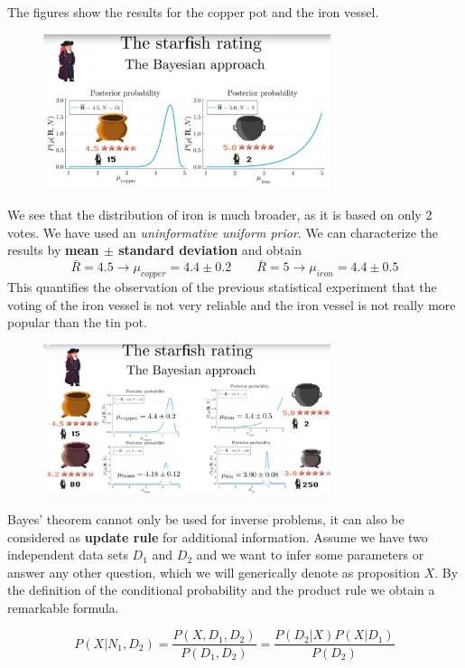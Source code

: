 \documentclass[12pt, a4paper]{scrartcl}
\begin{document}
The figures show the results for the copper pot and the iron vessel. %
 \begin{figure}[H]
	\centering
	\includegraphics[width=0.75\textwidth]{6_11.png}
\end{figure}
We see
that the distribution of iron is much broader, as it is based on only 2 votes. We
have used an \textit{uninformative uniform prior}.
We can characterize the results by \textbf{mean $\pm$ standard deviation} and
obtain \[\bar{R}=4.5\rightarrow \mu_{copper}=4.4\pm0.2\qquad \bar{R}=5\rightarrow \mu_{iron}=4.4\pm0.5\]
This quantifies the observation of the previous statistical experiment that
the voting of the iron vessel is not very reliable and the iron vessel is not
really more popular than the tin pot.\\%
 \begin{figure}[H]
	\centering
	\includegraphics[width=0.75\textwidth]{6_12.png}
\end{figure}


Bayes’ theorem cannot only be used for inverse problems, it can also be considered 
as \textbf{update rule} for additional information.
Assume we have two independent data sets $D_1$ and $D_2$ and we want to infer
some parameters or answer any other question, which we will generically
denote as proposition $X$. By the definition of the conditional probability
and the product rule we obtain a remarkable formula.

\begin{equation*}\boxed{P(X|N_1,D_2)=\frac{P(X,D_1,D_2)}{P(D_1,D_2)}=\frac{P(D_2|X)P(X|D_1)}{P(D_2)}
}\end{equation*}\\
\end{document}
